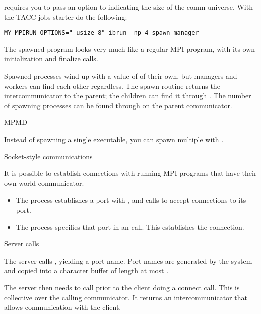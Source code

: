 \begin{taccnote}
 requires you to pass an option  to
 indicating the size of the comm universe. With the TACC
jobs starter  do the following:
\begin{verbatim}
MY_MPIRUN_OPTIONS="-usize 8" ibrun -np 4 spawn_manager
\end{verbatim}
\end{taccnote}
The spawned program looks very much like a regular MPI program, with
its own initialization and finalize calls.

%

Spawned processes wind up with a value of  of their
own, but managers and workers can find each other regardless.
The spawn routine returns the intercommunicator to the parent; the children
can find it through . The number of
spawning processes can be found through
 on the parent communicator.


 {MPMD}

Instead of spawning a single executable, you can spawn multiple with
.

 {Socket-style communications}

It is possible to establish connections with running MPI programs that
have their own world communicator.
\begin{itemize}
\item The  process establishes a port with 
  , and calls  to accept
  connections to its port.
\item The  process specifies that port 
  in an  call. This establishes the connection.
\end{itemize}

 {Server calls}

The server calls , yielding a port name.
Port names are generated by the system and copied into a character
buffer of length at most .


The server then needs to call 
 prior to the client doing a connect call.
This is collective over the calling communicator. It returns an
intercommunicator that allows communication with the client.

